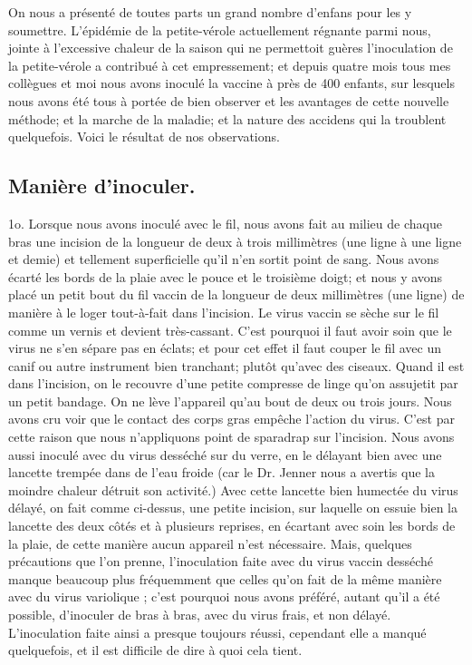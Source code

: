 On nous a présenté de toutes parts un grand nombre d'enfans pour les y soumettre.\setcounter{page}{77} L'épidémie de la petite-vérole actuellement régnante parmi nous, jointe à l'excessive chaleur de la saison qui ne permettoit guères l'inoculation de la petite-vérole a contribué à cet empressement; et depuis quatre mois tous mes collègues et moi nous avons inoculé la vaccine à près de 400 enfants, sur lesquels nous avons été tous à portée de bien observer et les avantages de cette nouvelle méthode; et la marche de la maladie; et la nature des accidens qui la troublent quelquefois. Voici le résultat de nos observations.
\subsection{Manière d'inoculer.}
1o. Lorsque nous avons inoculé avec le fil, nous avons fait au milieu de chaque bras une incision de la longueur de deux à trois millimètres (une ligne à une ligne et demie) et tellement superficielle qu'il n'en sortit point de sang. Nous avons écarté les bords de la plaie avec le pouce et le troisième doigt; et nous y avons placé un petit bout du fil vaccin de la longueur de deux millimètres (une ligne) de manière à le loger tout-à-fait dans l'incision. Le virus vaccin se sèche sur le fil comme un vernis et devient très-cassant. C'est pourquoi il faut avoir soin que le virus ne s'en sépare pas en éclats; et pour cet effet il faut couper le fil avec un canif ou autre instrument bien tranchant; plutôt qu'avec\setcounter{page}{78} des ciseaux. Quand il est dans l'incision, on le recouvre d'une petite compresse de linge qu'on assujetit par un petit bandage. On ne lève l'appareil qu'au bout de deux ou trois jours. Nous avons cru voir que le contact des corps gras empêche l'action du virus. C'est par cette raison que nous n'appliquons point de sparadrap sur l'incision.
Nous avons aussi inoculé avec du virus desséché sur du verre, en le délayant bien avec une lancette trempée dans de l'eau froide (car le Dr. Jenner nous a avertis que la moindre chaleur détruit son activité.) Avec cette lancette bien humectée du virus délayé, on fait comme ci-dessus, une petite incision, sur laquelle on essuie bien la lancette des deux côtés et à plusieurs reprises, en écartant avec soin les bords de la plaie, de cette manière aucun appareil n'est nécessaire.
Mais, quelques précautions que l'on prenne, l'inoculation faite avec du virus vaccin desséché manque beaucoup plus fréquemment que celles qu'on fait de la même manière avec du virus variolique ; c'est pourquoi nous avons préféré, autant qu'il a été possible, d'inoculer de bras à bras, avec du virus frais, et non délayé. L'inoculation faite ainsi a presque toujours réussi, cependant elle a manqué quelquefois, et il est difficile de dire à quoi cela tient.
